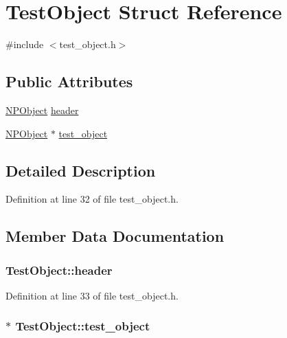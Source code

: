 \hypertarget{struct_test_object}{
\section{TestObject Struct Reference}
\label{struct_test_object}
}


{\ttfamily \#include $<$test\_\-object.h$>$}

\subsection*{Public Attributes}
\begin{DoxyCompactItemize}
\item 
\hyperlink{struct_n_p_object}{NPObject} \hyperlink{struct_test_object_a23d7a50afe1b29f85b5d663cbfc763b2}{header}
\item 
\hyperlink{struct_n_p_object}{NPObject} $\ast$ \hyperlink{struct_test_object_a375c492938a3abf12d768b8578549861}{test\_\-object}
\end{DoxyCompactItemize}


\subsection{Detailed Description}


Definition at line 32 of file test\_\-object.h.



\subsection{Member Data Documentation}
\hypertarget{struct_test_object_a23d7a50afe1b29f85b5d663cbfc763b2}{
\subsubsection[{header}]{ {\bf TestObject::header}}}
\label{struct_test_object_a23d7a50afe1b29f85b5d663cbfc763b2}


Definition at line 33 of file test\_\-object.h.

\hypertarget{struct_test_object_a375c492938a3abf12d768b8578549861}{
\subsubsection[{test\_\-object}]{ $\ast$ {\bf TestObject::test\_\-object}}}
\label{struct_test_object_a375c492938a3abf12d768b8578549861}


